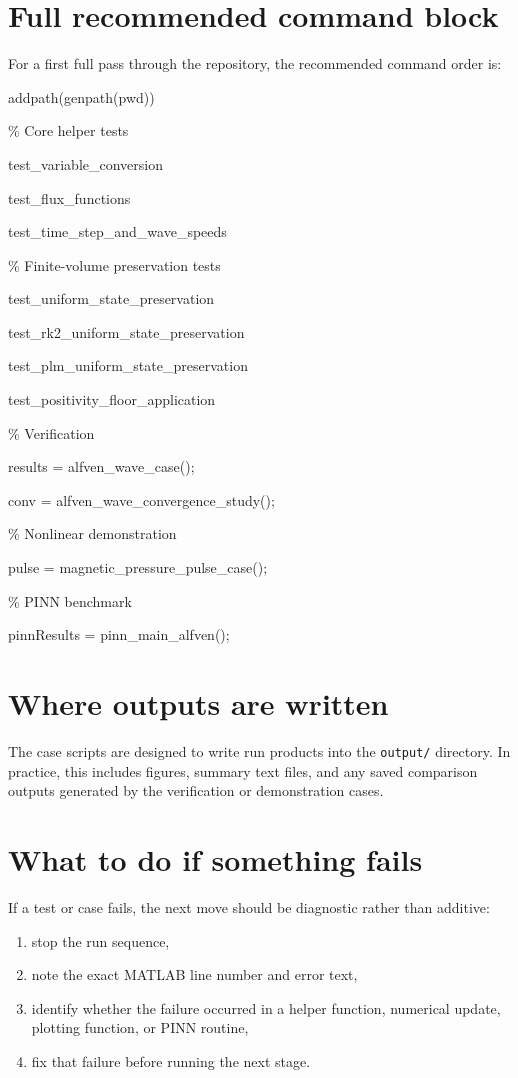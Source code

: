 \documentclass[11pt]{article}
\begin{document}
\section{Full recommended command block}
For a first full pass through the repository, the recommended command order is:
\begin{center}
\begin{minipage}{0.92\linewidth}
\ttfamily
addpath(genpath(pwd))\par
\par
\% Core helper tests\par
test\_variable\_conversion\par
test\_flux\_functions\par
test\_time\_step\_and\_wave\_speeds\par
\par
\% Finite-volume preservation tests\par
test\_uniform\_state\_preservation\par
test\_rk2\_uniform\_state\_preservation\par
test\_plm\_uniform\_state\_preservation\par
test\_positivity\_floor\_application\par
\par
\% Verification\par
results = alfven\_wave\_case();\par
conv = alfven\_wave\_convergence\_study();\par
\par
\% Nonlinear demonstration\par
pulse = magnetic\_pressure\_pulse\_case();\par
\par
\% PINN benchmark\par
pinnResults = pinn\_main\_alfven();
\end{minipage}
\end{center}

\section{Where outputs are written}
The case scripts are designed to write run products into the \texttt{output/} directory. In practice, this includes figures, summary text files, and any saved comparison outputs generated by the verification or demonstration cases.

\section{What to do if something fails}
If a test or case fails, the next move should be diagnostic rather than additive:
\begin{enumerate}[leftmargin=1.8em]
    \item stop the run sequence,
    \item note the exact MATLAB line number and error text,
    \item identify whether the failure occurred in a helper function, numerical update, plotting function, or PINN routine,
    \item fix that failure before running the next stage.
\end{enumerate}
\end{document}
